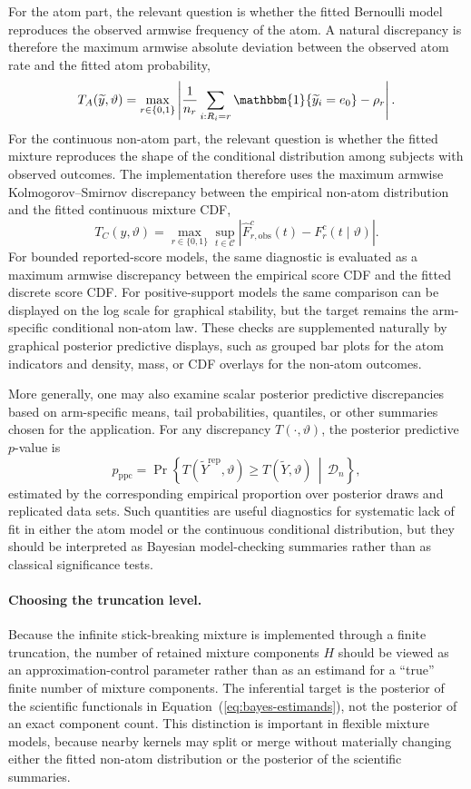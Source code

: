 \documentclass[11pt]{article}
\begin{document}
For the atom part, the relevant question is whether the fitted Bernoulli model reproduces the observed armwise frequency of the atom. A natural discrepancy is therefore the maximum armwise absolute deviation between the observed atom rate and the fitted atom probability,
\[
  T_A(\widetilde{y},\vartheta)
  =
  \max_{r \in \{0,1\}}
  \left|
    \frac{1}{n_r}\sum_{i:R_i=r}\mathbbm{1}\{\widetilde{y}_i = e_0\} - \rho_r
  \right|.
\]
For the continuous non-atom part, the relevant question is whether the fitted mixture reproduces the shape of the conditional distribution among subjects with observed outcomes. The implementation therefore uses the maximum armwise Kolmogorov--Smirnov discrepancy between the empirical non-atom distribution and the fitted continuous mixture CDF,
\[
  T_C(y,\vartheta)
  =
  \max_{r \in \{0,1\}}
  \sup_{t \in \mathcal{C}}
  \left|
    \widehat{F}_{r,\mathrm{obs}}^c(t) - F_r^c(t \mid \vartheta)
  \right|.
\]
For bounded reported-score models, the same diagnostic is evaluated as a maximum armwise discrepancy between the empirical score CDF and the fitted discrete score CDF. For positive-support models the same comparison can be displayed on the log scale for graphical stability, but the target remains the arm-specific conditional non-atom law. These checks are supplemented naturally by graphical posterior predictive displays, such as grouped bar plots for the atom indicators and density, mass, or CDF overlays for the non-atom outcomes.

More generally, one may also examine scalar posterior predictive discrepancies based on arm-specific means, tail probabilities, quantiles, or other summaries chosen for the application. For any discrepancy $T(\cdot,\vartheta)$, the posterior predictive $p$-value is
\[
  p_{\mathrm{ppc}}
  =
  \Pr\!\left\{
    T(\widetilde{Y}^{\mathrm{rep}},\vartheta)
    \geq
    T(\widetilde{Y},\vartheta)
    \,\middle|\,
    \mathcal{D}_n
  \right\},
\]
estimated by the corresponding empirical proportion over posterior draws and replicated data sets. Such quantities are useful diagnostics for systematic lack of fit in either the atom model or the continuous conditional distribution, but they should be interpreted as Bayesian model-checking summaries rather than as classical significance tests.

\paragraph{Choosing the truncation level.}
Because the infinite stick-breaking mixture is implemented through a finite truncation, the number of retained mixture components $H$ should be viewed as an approximation-control parameter rather than as an estimand for a ``true'' finite number of mixture components. The inferential target is the posterior of the scientific functionals in Equation~(\ref{eq:bayes-estimands}), not the posterior of an exact component count. This distinction is important in flexible mixture models, because nearby kernels may split or merge without materially changing either the fitted non-atom distribution or the posterior of the scientific summaries.
\end{document}
